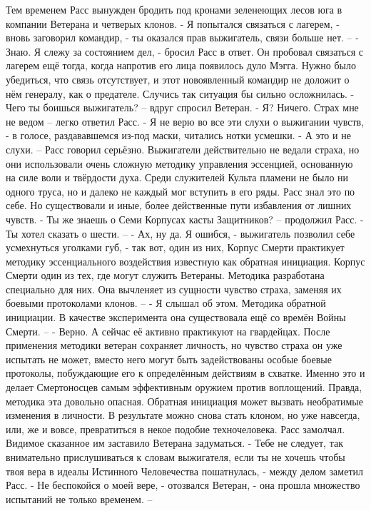 \documentclass[a4paper, 12pt]{report}
\begin{document}
Тем временем Расс вынужден бродить под кронами зеленеющих лесов юга в компании Ветерана и четверых клонов. 
- Я попытался связаться с лагерем, - вновь заговорил командир, - ты оказался прав выжигатель, связи больше нет. –
- Знаю. Я слежу за состоянием дел, - бросил Расс в ответ. Он пробовал связаться с лагерем ещё тогда, когда напротив его лица появилось дуло Мэгга. Нужно было убедиться, что связь отсутствует, и этот новоявленный командир не доложит о нём генералу, как о предателе. Случись так ситуация бы сильно осложнилась.
- Чего ты боишься выжигатель? – вдруг спросил Ветеран.
- Я? Ничего. Страх мне не ведом – легко ответил Расс.
- Я не верю во все эти слухи о выжигании чувств, - в голосе, раздававшемся из-под маски, читались нотки усмешки.
- А это и не слухи. –
Расс говорил серьёзно. Выжигатели действительно не ведали страха, но они использовали очень сложную методику управления эссенцией, основанную на силе воли и твёрдости духа. Среди служителей Культа пламени не было ни одного труса, но и далеко не каждый мог вступить в его ряды. Расс знал это по себе. Но существовали и иные, более действенные пути избавления от лишних чувств.
- Ты же знаешь о Семи Корпусах касты Защитников? – продолжил Расс.
- Ты хотел сказать о шести. –
- Ах, ну да. Я ошибся, - выжигатель позволил себе усмехнуться уголками губ, - так вот, один из них, Корпус Смерти практикует методику эссенциального воздействия известную как обратная инициация. Корпус Смерти один из тех, где могут служить Ветераны. Методика разработана специально для них. Она вычленяет из сущности чувство страха, заменяя их боевыми протоколами клонов. –
- Я слышал об этом. Методика обратной инициации. В качестве эксперимента она существовала ещё со времён Войны Смерти. –
- Верно. А сейчас её активно практикуют на гвардейцах. После применения методики ветеран сохраняет личность, но чувство страха он уже испытать не может, вместо него могут быть задействованы особые боевые протоколы, побуждающие его к определённым действиям в схватке. Именно это и делает Смертоносцев самым эффективным оружием против воплощений. Правда, методика эта довольно опасная. Обратная инициация может вызвать необратимые изменения в личности. В результате можно снова стать клоном, но уже навсегда, или, же и вовсе, превратиться в некое подобие техночеловека.
Расс замолчал. Видимое сказанное им заставило Ветерана задуматься.
- Тебе не следует, так внимательно прислушиваться к словам выжигателя, если ты не хочешь чтобы твоя вера в идеалы Истинного Человечества пошатнулась, - между делом заметил Расс.
- Не беспокойся о моей вере, - отозвался Ветеран, - она прошла множество испытаний не только временем. –
\end{document}
